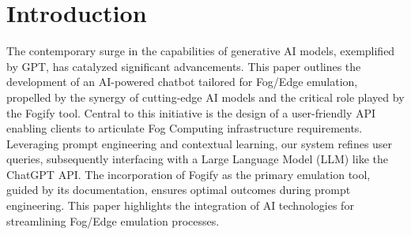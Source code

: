\section{Introduction}
\label{sec:introduction}
The contemporary surge in the capabilities of generative AI models, exemplified
by GPT, has catalyzed significant advancements. This paper outlines the
development of an AI-powered chatbot tailored for Fog/Edge emulation, propelled
by the synergy of cutting-edge AI models and the critical role played by the
Fogify tool. Central to this initiative is the design of a user-friendly API
enabling clients to articulate Fog Computing infrastructure requirements.
Leveraging prompt engineering and contextual learning, our system refines user
queries, subsequently interfacing with a Large Language Model (LLM) like the
ChatGPT API. The incorporation of Fogify as the primary emulation tool, guided
by its documentation, ensures optimal outcomes during prompt engineering. This
paper highlights the integration of AI technologies for streamlining Fog/Edge
emulation processes.